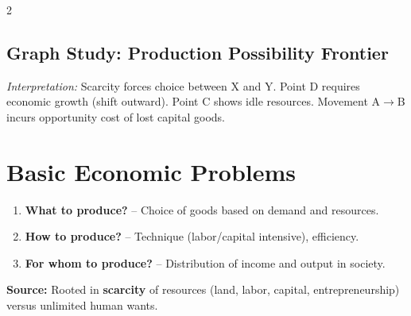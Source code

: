 \documentclass[10pt,a4paper]{article}
\begin{document}
\begin{multicols}{2}
\subsection*{Graph Study: Production Possibility Frontier}
\begin{center}
\end{center}
\textit{Interpretation:} Scarcity forces choice between X and Y. Point D requires economic growth (shift outward). Point C shows idle resources. Movement A$\to$B incurs opportunity cost of lost capital goods.

\columnbreak

\section*{Basic Economic Problems}
\begin{enumerate}[leftmargin=*,nosep]
    \item \textbf{What to produce?} -- Choice of goods based on demand and resources.
    \item \textbf{How to produce?} -- Technique (labor/capital intensive), efficiency.
    \item \textbf{For whom to produce?} -- Distribution of income and output in society.
\end{enumerate}
\textbf{Source:} Rooted in \textbf{scarcity} of resources (land, labor, capital, entrepreneurship) versus unlimited human wants.


\end{multicols}
\end{document}

